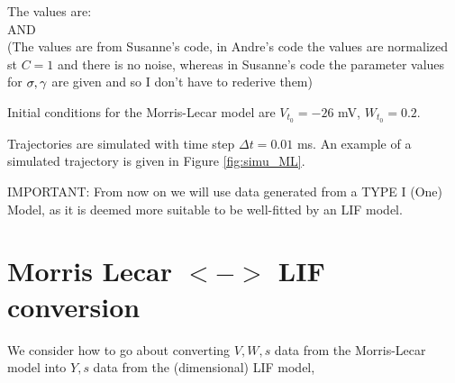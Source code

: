 \documentclass{article}
\begin{document}
The values are:\\ 

AND \\



(The values are from Susanne's code, in Andre's code the values are normalized
st $C= 1$ and there is no noise, whereas in Susanne's code the parameter values
for ${\sigma }, {\gamma }$ are given and so I don't have to rederive them)

Initial conditions for the Morris-Lecar model are $V_{t_0} = -26$ mV, $W_{t_0} =
0.2$. 

Trajectories are simulated with time step $\Delta
t=0.01$ ms.  An example of a simulated trajectory is
given in Figure \ref{fig:simu_ML}.

IMPORTANT: From now on we will use data generated from a TYPE I (One) Model, as
it is deemed more suitable to be well-fitted by an LIF model.


\section{Morris Lecar $<->$ LIF conversion}
We consider how to go about converting $V,W,s$ data from the Morris-Lecar model
into $Y,s$ data from the (dimensional) LIF model,
 
\end{document}
